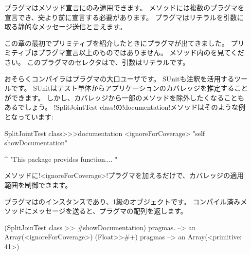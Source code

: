 \documentclass[a4paper,10pt,twoside]{book}
\begin{document}
プラグマはメソッド宣言にのみ適用できます。
メソッドには複数のプラグマを宣言でき、\st 文より前に宣言する必要があります。
プラグマはリテラルを引数に取る静的なメッセージ送信と言えます。

この章の最初でプリミティブを紹介したときにプラグマが出てきました。
プリミティブはプラグマ宣言以上のものではありません。
メソッド内のを見てください。
このプラグマのセレクタはで、引数はリテラルです。

おそらくコンパイラはプラグマの大口ユーザです。
SUnitも注釈を活用するツールです。
SUnitはテスト単体からアプリケーションのカバレッジを推定することができます。
しかし、カバレッジから一部のメソッドを除外したくなることもあるでしょう。
\ct!SplitJointTest class!の\ct!documentation!メソッドはそのような例となっています:

\begin{code}{}
SplitJointTest class>>>documentation
	<ignoreForCoverage>
	"self showDocumentation"
	
	^ 'This package provides function.... "
\end{code}

メソッドに\ct!<ignoreForCoverage>!プラグマを加えるだけで、カバレッジの適用範囲を制御できます。


%	


プラグマはのインスタンスであり、1級のオブジェクトです。
コンパイル済みメソッドにメッセージを送ると、プラグマの配列を返します。

\begin{code}{}
(SplitJoinTest class >> #showDocumentation) pragmas.
  --> an Array(<ignoreForCoverage>)
(Float>>#+) pragmas --> an Array(<primitive: 41>)
\end{code}
\end{document}
